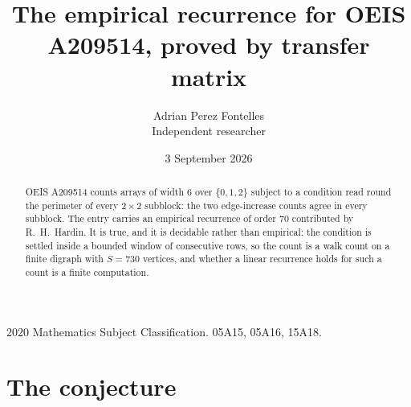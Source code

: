 \documentclass[11pt,a4paper]{article}
\title{The empirical recurrence for OEIS A209514, proved by transfer matrix}
\author{Adrian Perez Fontelles\\ \small Independent researcher}
\date{3 September 2026}
\theoremstyle{plain}
\theoremstyle{definition}
\begin{document}
\maketitle

\begin{abstract}
OEIS A209514 counts arrays of width $6$ over $\{0,1,2\}$ subject to a condition read round the
perimeter of every $2\times2$ subblock: the two edge-increase counts agree in every subblock. The entry carries an empirical recurrence of
order $70$ contributed by R.~H.~Hardin. It is true, and it is decidable rather than
empirical: the condition is settled inside a bounded window of consecutive rows, so the
count is a walk count on a finite digraph with $S=730$ vertices, and whether a linear
recurrence holds for such a count is a finite computation.
\end{abstract}

\noindent\small 2020 Mathematics Subject Classification. 05A15, 05A16, 15A18.\normalsize

\section{The conjecture}
\end{document}
